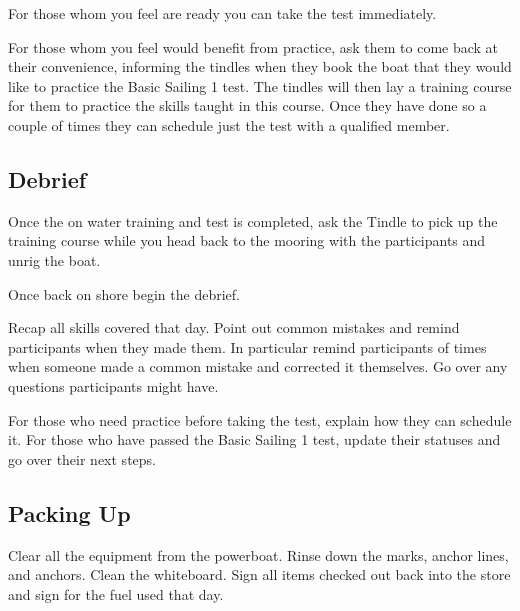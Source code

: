 \documentclass[12pt]{scrartcl}
\begin{document}
For those whom you feel are ready you can take the test immediately.

For those whom you feel would benefit from practice, ask them to come back at their convenience, informing the tindles when they book the boat that they would like to practice the Basic Sailing 1 test. The tindles will then lay a training course for them to practice the skills taught in this course. Once they have done so a couple of times they can schedule just the test with a qualified member.

\subsection{Debrief} \label{subsec: Debrief}

Once the on water training and test is completed, ask the Tindle to pick up the training course while you head back to the mooring with the participants and unrig the boat.

Once back on shore begin the debrief.

Recap all skills covered that day. Point out common mistakes and remind participants when they made them. In particular remind participants of times when someone made a common mistake and corrected it themselves. Go over any questions participants might have.

For those who need practice before taking the test, explain how they can schedule it. For those who have passed the Basic Sailing 1 test, update their statuses and go over their next steps.

\subsection{Packing Up} \label{subsec:packing up}

Clear all the equipment from the powerboat. Rinse down the marks, anchor lines, and anchors. Clean the whiteboard. Sign all items checked out back into the store and sign for the fuel used that day.
\end{document}
